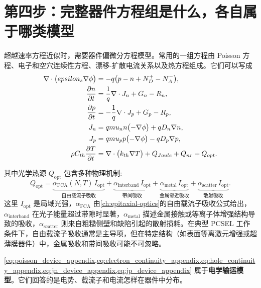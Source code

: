 \section{第四步：完整器件方程组是什么，各自属于哪类模型}
超越速率方程近似时，需要器件偏微分方程模型。常用的一组方程由 Poisson 方程、电子和空穴连续性方程、漂移-扩散电流关系以及热方程组成。它们可以写成
\begin{align}
\nabla\cdot\bigl(epsilon_s\nabla\phi\bigr)
&=
-q\bigl(p-n+N_D^+-N_A^-\bigr),
\label{eq:poisson_device_appendix}
\\
\frac{\partial n}{\partial t}
&=
\frac{1}{q}\nabla\cdot J_n
+ G_n - R_n,
\label{eq:electron_continuity_appendix}
\\
\frac{\partial p}{\partial t}
&=
-\frac{1}{q}\nabla\cdot J_p
+ G_p - R_p,
\label{eq:hole_continuity_appendix}
\\
J_n &=
qmu_n n\bigl(-\nabla\phi\bigr)
+ qD_n\nabla n,
\label{eq:jn_device_appendix}
\\
J_p &=
qmu_p p\bigl(-\nabla\phi\bigr)
- qD_p\nabla p,
\label{eq:jp_device_appendix}
\\
\rho C_{th}\frac{\partial T}{\partial t}
&=
\nabla\cdot\bigl(k_{th}\nabla T\bigr)
+ Q_{Joule}
+ Q_{nr}
+ Q_{opt}.
\label{eq:heat_device_appendix}
\end{align}

其中光学热源 $Q_{\mathrm{opt}}$ 包含多种物理机制:
\begin{equation}
Q_{\mathrm{opt}}
=
\underbrace{\alpha_{\mathrm{FCA}}(N,T)\,I_{\mathrm{opt}}}_{\text{自由载流子吸收}}
+
\underbrace{\alpha_{\mathrm{interband}}\,I_{\mathrm{opt}}}_{\text{带间吸收}}
+
\underbrace{\alpha_{\mathrm{metal}}\,I_{\mathrm{opt}}}_{\text{金属邻近吸收}}
+
\underbrace{\alpha_{\mathrm{scatter}}\,I_{\mathrm{opt}}}_{\text{散射吸收}}.
\label{eq:optical_heat_source_expanded}
\end{equation}
这里 $I_{\mathrm{opt}}$ 是局域光强，$\alpha_{\mathrm{FCA}}$ 由\cref{ch:epitaxial-optics}的自由载流子吸收公式给出，$\alpha_{\mathrm{interband}}$ 在光子能量超过带隙时显著，$\alpha_{\mathrm{metal}}$ 描述金属接触或等离子体增强结构导致的吸收，$\alpha_{\mathrm{scatter}}$ 则来自粗糙侧壁和缺陷引起的散射损耗。在典型 PCSEL 工作条件下，自由载流子吸收通常是主导项，但在特定结构（如表面等离激元增强或超薄膜器件）中，金属吸收和带间吸收可能不可忽略。

\cref{eq:poisson_device_appendix,eq:electron_continuity_appendix,eq:hole_continuity_appendix,eq:jn_device_appendix,eq:jp_device_appendix} 属于\textbf{电学输运模型}。它们回答的是电势、载流子和电流怎样在器件中分布。

